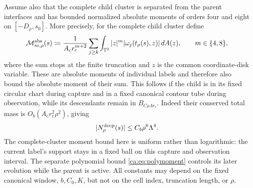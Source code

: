\documentclass[11pt]{amsart}
\theoremstyle{remark}
\numberwithin{equation}{section}
\newcommand{\T}{\mathbb T}
\begin{document}
Assume also that the complete child cluster is separated from the
parent interfaces and has bounded normalized absolute moments of
orders four and eight on $[-D_\rho,s_0]$. More precisely, for the complete child cluster define
\begin{equation}\label{re:def:absolute-moments}
 \mathcal M_{m,\rho}^{\rm abs}(s)\coloneqq
 \frac{1}{A_cr_c^{m+2}}\sum_{j\ge k}
 \int_{\T^2}|z|^m|\omega_j(t_\rho(s),z)|\,dA(z),
 \qquad m\in\{4,8\},
\end{equation}
where the sum stops at the finite truncation and $z$ is the common
coordinate-disk variable. These are absolute moments of individual
labels and therefore also bound the absolute moment of their sum. This follows if the child is in its fixed
circular chart during capture and in a fixed canonical contour tube
during observation, while its descendants remain in
$B_{C\rho\Lambda r_c}$. Indeed their conserved total mass is
$O_b(A_cr_c^2\rho^2)$, giving
\begin{equation}\label{re:eq:deep}
 |N^{\rm deep}_\rho(s)|\leq C_b\rho^6\Lambda^4.
\end{equation}
The complete-cluster moment bound here is uniform rather than
logarithmic: the current label's support stays in a fixed ball on
this capture and observation interval. The separate polynomial bound
\eqref{ca:eq:polymoment} controls its later evolution while the parent
is active. All constants may depend on the fixed canonical window,
$b,C_0,K$, but not on the cell index, truncation length, or $\rho$.
\end{document}
